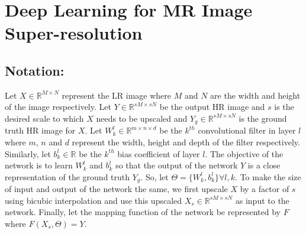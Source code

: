 \documentclass{article}
\def\sqz{\vspace{-3pt}}
\begin{document}
\sqz\sqz
\section{Deep Learning for MR Image Super-resolution}
\label{sec:DNSP}
\vspace{-.3cm}
\subsection{Notation:}
Let $X \in \mathbb{R}^{M\times N}$ represent the LR image where $M$ and $N$ are the width and height of the image respectively. Let $Y\in \mathbb{R}^{sM\times sN}$ be the output HR image and $s$ is the desired scale to which $X$ needs to be upscaled and $Y_{g} \in \mathbb{R}^{sM\times sN}$ is the ground truth HR image for $X$. Let $W_{k}^{l} \in \mathbb{R}^{m\times n\times d}$ be the $k^{th}$ convolutional filter in layer $l$ where $m$, $n$ and $d$ represent the width, height and depth of the filter respectively. Similarly, let $b_{k}^{l} \in \mathbb{R}$ be the $k^{th}$ bias coefficient of layer $l$. The objective of the network is to learn $W_{k}^{l}$ and $b_{k}^{l}$ so that the output of the network $Y$ is a close representation of the ground truth $Y_{g}$. So, let $\Theta = \{W_{k}^{l}, b_{k}^{l}\} \forall l,k$. To make the size of input and output of the network the same, we first upscale $X$ by a factor of $s$ using bicubic interpolation and use this upscaled $X_{s}\in \mathbb{R}^{sM\times sN}$ as input to the network. Finally, let the mapping function of the network be represented by $F$ where $F(X_{s}, \Theta) = Y$.
\end{document}
